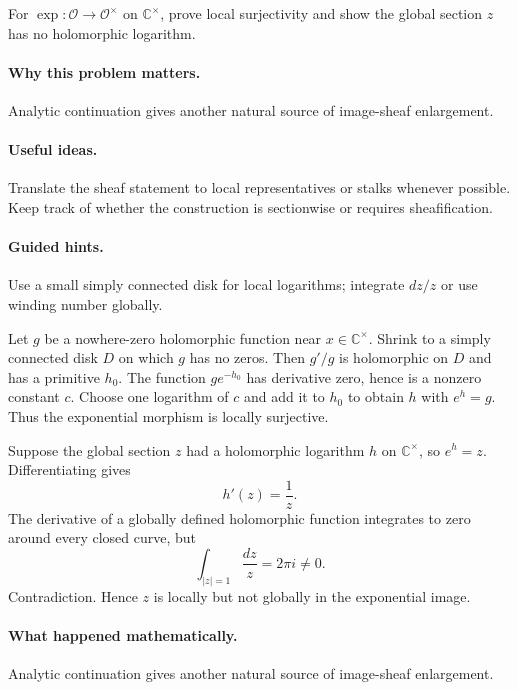 \begin{problem}\label{prob:vi15-p18}
For $\exp:\mathcal O\to\mathcal O^\times$ on $\mathbb C^\times$, prove local surjectivity and show the global section $z$ has no holomorphic logarithm.
\end{problem}

\ifdefined\FullProblemDossiers
\paragraph{Why this problem matters.}
Analytic continuation gives another natural source of image-sheaf enlargement.

\paragraph{Useful ideas.}
Translate the sheaf statement to local representatives or stalks whenever possible.  Keep track of whether the construction is sectionwise or requires sheafification.

\paragraph{Guided hints.}
Use a small simply connected disk for local logarithms; integrate $dz/z$ or use winding number globally.

\begin{solution}
Let $g$ be a nowhere-zero holomorphic function near $x\in\mathbb C^\times$. Shrink to a simply connected disk $D$ on which $g$ has no zeros. Then $g'/g$ is holomorphic on $D$ and has a primitive $h_0$. The function $ge^{-h_0}$ has derivative zero, hence is a nonzero constant $c$. Choose one logarithm of $c$ and add it to $h_0$ to obtain $h$ with $e^h=g$. Thus the exponential morphism is locally surjective.

Suppose the global section $z$ had a holomorphic logarithm $h$ on $\mathbb C^\times$, so $e^h=z$. Differentiating gives
\[
h'(z)=\frac1z.
\]
The derivative of a globally defined holomorphic function integrates to zero around every closed curve, but
\[
\int_{|z|=1}\frac{dz}{z}=2\pi i\neq0.
\]
Contradiction. Hence $z$ is locally but not globally in the exponential image.
\end{solution}

\paragraph{What happened mathematically.}
Analytic continuation gives another natural source of image-sheaf enlargement.

